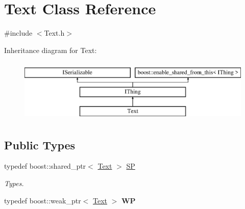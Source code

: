 \hypertarget{class_text}{}\section{Text Class Reference}
\label{class_text}


{\ttfamily \#include $<$Text.\+h$>$}

Inheritance diagram for Text\+:\begin{figure}[H]
\begin{center}
\leavevmode
\includegraphics[height=3.000000cm]{class_text}
\end{center}
\end{figure}
\subsection*{Public Types}
\begin{DoxyCompactItemize}
\item 
\mbox{\label{class_text_a35ce88bdca4f380b865b6066079230b1}} 
typedef boost\+::shared\+\_\+ptr$<$ \hyperlink{class_text}{Text} $>$ \hyperlink{class_text_a35ce88bdca4f380b865b6066079230b1}{SP}
\begin{DoxyCompactList}\small\item\em Types. \end{DoxyCompactList}\item 
\mbox{\label{class_text_accc04109f85aad769e96b5f63139c0da}} 
typedef boost\+::weak\+\_\+ptr$<$ \hyperlink{class_text}{Text} $>$ {\bfseries WP}
\end{DoxyCompactItemize}
